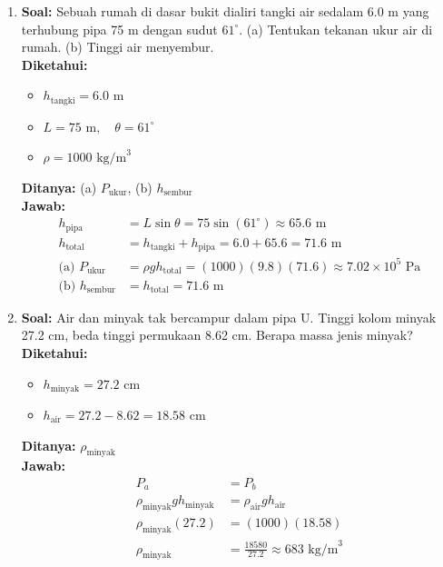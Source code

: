 \documentclass[twocolumn]{article}
\begin{document}
\begin{enumerate}
    \item \textbf{Soal:} Sebuah rumah di dasar bukit dialiri tangki air sedalam 6.0 m yang terhubung pipa 75 m dengan sudut $61^\circ$. (a) Tentukan tekanan ukur air di rumah. (b) Tinggi air menyembur. \\
    \textbf{Diketahui:} 
    \begin{itemize}
        \item $h_{\text{tangki}} = 6.0 \text{ m}$
        \item $L = 75 \text{ m}, \quad \theta = 61^\circ$
        \item $\rho = 1000 \text{ kg/m}^3$
    \end{itemize}
    \textbf{Ditanya:} (a) $P_{\text{ukur}}$, (b) $h_{\text{sembur}}$ \\
    \textbf{Jawab:}
    \begin{align*}
        h_{\text{pipa}} &= L \sin\theta = 75 \sin(61^\circ) \approx 65.6 \text{ m} \\
        h_{\text{total}} &= h_{\text{tangki}} + h_{\text{pipa}} = 6.0 + 65.6 = 71.6 \text{ m} \\
        \text{(a) } P_{\text{ukur}} &= \rho g h_{\text{total}} = (1000)(9.8)(71.6) \approx 7.02 \times 10^5 \text{ Pa} \\
        \text{(b) } h_{\text{sembur}} &= h_{\text{total}} = 71.6 \text{ m}
    \end{align*}

    \item \textbf{Soal:} Air dan minyak tak bercampur dalam pipa U. Tinggi kolom minyak 27.2 cm, beda tinggi permukaan 8.62 cm. Berapa massa jenis minyak? \\
    \textbf{Diketahui:} 
    \begin{itemize}
        \item $h_{\text{minyak}} = 27.2 \text{ cm}$
        \item $h_{\text{air}} = 27.2 - 8.62 = 18.58 \text{ cm}$
    \end{itemize}
    \textbf{Ditanya:} $\rho_{\text{minyak}}$ \\
    \textbf{Jawab:}
    \begin{align*}
        P_a &= P_b \\
        \rho_{\text{minyak}} g h_{\text{minyak}} &= \rho_{\text{air}} g h_{\text{air}} \\
        \rho_{\text{minyak}} (27.2) &= (1000)(18.58) \\
        \rho_{\text{minyak}} &= \frac{18580}{27.2} \approx 683 \text{ kg/m}^3
    \end{align*}


\end{enumerate}
\end{document}
